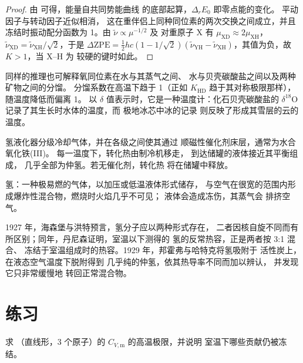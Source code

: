 \begin{proof}
由  可得，能量自共同势能曲线
的底部起算，$\Delta_rE_0$ 即零点能的变化。
平动因子与转动因子近似相消，
这在重伴侣上同种同位素的两次交换之间成立，并且
冻结时振动配分函数为 1。由 $\tilde\nu \propto \mu^{-1/2}$ 及
对重原子 X 有 $\mu_{\mathrm{XD}} \approx 2\mu_{\mathrm{XH}}$，$\tilde\nu_{\mathrm{XD}} = \tilde\nu_{\mathrm{XH}}/\sqrt2$，于是 $\Delta\mathrm{ZPE} =
\frac12hc(1 - 1/\sqrt2)(\tilde\nu_{\mathrm{YH}} - \tilde\nu_{\mathrm{XH}})$，其值为负，故 $K > 1$，当 X--H 为
较硬的键时如此。
\end{proof}

同样的推理也可解释氧同位素在水与其蒸气之间、
水与贝壳碳酸盐之间以及两种矿物之间的分馏。
分馏系数在高温下趋于 1（正如 $K_{\mathrm{HD}}$
趋于其对称极限那样），随温度降低而偏离 1。
以 $\delta$ 值表示时，它是一种温度计：化石贝壳碳酸盐的 $\delta^{18}$O
记录了其生长时水体的温度，而
极地冰芯中冰的记录
则反映了形成其雪层的云的温度。

\begin{inthelab}[正–仲氢转换器]
氢液化器分级冷却气体，并在各级之间使其通过
顺磁性催化剂床层，通常为水合氧化铁(III)。
每一温度下，转化热由制冷机移走，
到达储罐的液体接近其平衡组成，
几乎全部为仲氢。若无催化剂，转化热
将在储罐中释放。
\end{inthelab}

\begin{safety}{}
氢：一种极易燃的气体，以加压或低温液体形式储存，
与空气在很宽的范围内形成爆炸性混合物，燃烧时火焰几乎不可见；
液体会造成冻伤，其蒸气会
排挤空气。
\end{safety}

\begin{history}[两种氢，1927--1929]
1927 年，海森堡与洪特预言，氢分子应以两种形式存在，
二者因核自旋不同而有所区别；同年，丹尼森证明，室温以下测得的
氢的反常热容，正是两者按 3:1 混合、
冻结于室温组成时的热容。1929 年，邦霍弗与哈特克将氢吸附于
活性炭上，在液态空气温度下脱附得到
几乎纯的仲氢，依其热导率不同而加以辨认，
并发现它只非常缓慢地
转回正常混合物。
\end{history}

\section{练习}

\begin{exercise}[$\star$]\label{exo:b3:statistical-thermo-applied:1}
求 （直线形，3 个原子）的 $C_{V,\mathrm m}$ 的高温极限，并说明
室温下哪些贡献仍被冻结。
\end{exercise}

